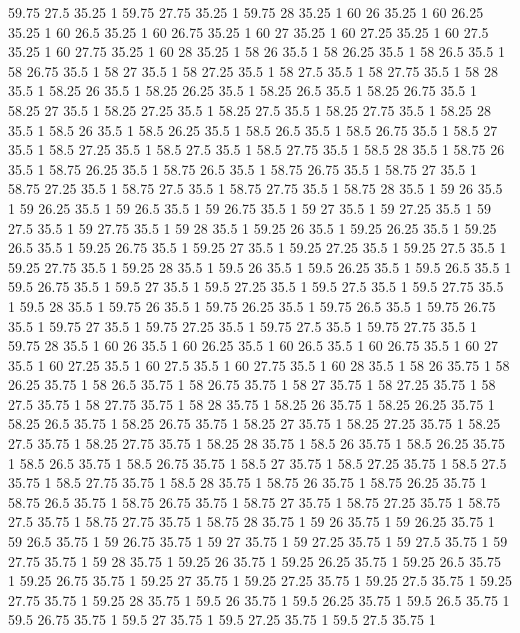 59.75 27.5 35.25 1
59.75 27.75 35.25 1
59.75 28 35.25 1
60 26 35.25 1
60 26.25 35.25 1
60 26.5 35.25 1
60 26.75 35.25 1
60 27 35.25 1
60 27.25 35.25 1
60 27.5 35.25 1
60 27.75 35.25 1
60 28 35.25 1
58 26 35.5 1
58 26.25 35.5 1
58 26.5 35.5 1
58 26.75 35.5 1
58 27 35.5 1
58 27.25 35.5 1
58 27.5 35.5 1
58 27.75 35.5 1
58 28 35.5 1
58.25 26 35.5 1
58.25 26.25 35.5 1
58.25 26.5 35.5 1
58.25 26.75 35.5 1
58.25 27 35.5 1
58.25 27.25 35.5 1
58.25 27.5 35.5 1
58.25 27.75 35.5 1
58.25 28 35.5 1
58.5 26 35.5 1
58.5 26.25 35.5 1
58.5 26.5 35.5 1
58.5 26.75 35.5 1
58.5 27 35.5 1
58.5 27.25 35.5 1
58.5 27.5 35.5 1
58.5 27.75 35.5 1
58.5 28 35.5 1
58.75 26 35.5 1
58.75 26.25 35.5 1
58.75 26.5 35.5 1
58.75 26.75 35.5 1
58.75 27 35.5 1
58.75 27.25 35.5 1
58.75 27.5 35.5 1
58.75 27.75 35.5 1
58.75 28 35.5 1
59 26 35.5 1
59 26.25 35.5 1
59 26.5 35.5 1
59 26.75 35.5 1
59 27 35.5 1
59 27.25 35.5 1
59 27.5 35.5 1
59 27.75 35.5 1
59 28 35.5 1
59.25 26 35.5 1
59.25 26.25 35.5 1
59.25 26.5 35.5 1
59.25 26.75 35.5 1
59.25 27 35.5 1
59.25 27.25 35.5 1
59.25 27.5 35.5 1
59.25 27.75 35.5 1
59.25 28 35.5 1
59.5 26 35.5 1
59.5 26.25 35.5 1
59.5 26.5 35.5 1
59.5 26.75 35.5 1
59.5 27 35.5 1
59.5 27.25 35.5 1
59.5 27.5 35.5 1
59.5 27.75 35.5 1
59.5 28 35.5 1
59.75 26 35.5 1
59.75 26.25 35.5 1
59.75 26.5 35.5 1
59.75 26.75 35.5 1
59.75 27 35.5 1
59.75 27.25 35.5 1
59.75 27.5 35.5 1
59.75 27.75 35.5 1
59.75 28 35.5 1
60 26 35.5 1
60 26.25 35.5 1
60 26.5 35.5 1
60 26.75 35.5 1
60 27 35.5 1
60 27.25 35.5 1
60 27.5 35.5 1
60 27.75 35.5 1
60 28 35.5 1
58 26 35.75 1
58 26.25 35.75 1
58 26.5 35.75 1
58 26.75 35.75 1
58 27 35.75 1
58 27.25 35.75 1
58 27.5 35.75 1
58 27.75 35.75 1
58 28 35.75 1
58.25 26 35.75 1
58.25 26.25 35.75 1
58.25 26.5 35.75 1
58.25 26.75 35.75 1
58.25 27 35.75 1
58.25 27.25 35.75 1
58.25 27.5 35.75 1
58.25 27.75 35.75 1
58.25 28 35.75 1
58.5 26 35.75 1
58.5 26.25 35.75 1
58.5 26.5 35.75 1
58.5 26.75 35.75 1
58.5 27 35.75 1
58.5 27.25 35.75 1
58.5 27.5 35.75 1
58.5 27.75 35.75 1
58.5 28 35.75 1
58.75 26 35.75 1
58.75 26.25 35.75 1
58.75 26.5 35.75 1
58.75 26.75 35.75 1
58.75 27 35.75 1
58.75 27.25 35.75 1
58.75 27.5 35.75 1
58.75 27.75 35.75 1
58.75 28 35.75 1
59 26 35.75 1
59 26.25 35.75 1
59 26.5 35.75 1
59 26.75 35.75 1
59 27 35.75 1
59 27.25 35.75 1
59 27.5 35.75 1
59 27.75 35.75 1
59 28 35.75 1
59.25 26 35.75 1
59.25 26.25 35.75 1
59.25 26.5 35.75 1
59.25 26.75 35.75 1
59.25 27 35.75 1
59.25 27.25 35.75 1
59.25 27.5 35.75 1
59.25 27.75 35.75 1
59.25 28 35.75 1
59.5 26 35.75 1
59.5 26.25 35.75 1
59.5 26.5 35.75 1
59.5 26.75 35.75 1
59.5 27 35.75 1
59.5 27.25 35.75 1
59.5 27.5 35.75 1
